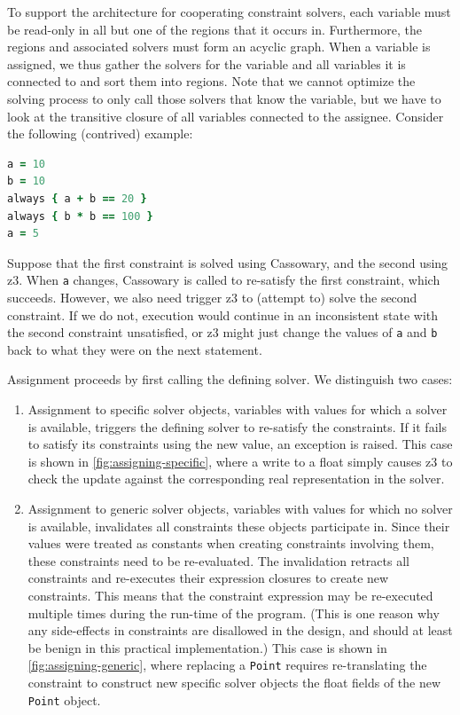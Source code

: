 To support the architecture for cooperating constraint solvers, each variable
must be read-only in all but one of the regions that it occurs in. Furthermore,
the regions and associated solvers must form an acyclic graph. When a variable
is assigned, we thus gather the solvers for the variable and all variables it is
connected to and sort them into regions. Note that we cannot optimize the
solving process to only call those solvers that know the variable, but we have
to look at the transitive closure of all variables connected to the assignee.
Consider the following (contrived) example:\\

\begin{lstlisting}[language=ruby]
a = 10
b = 10
always { a + b == 20 }
always { b * b == 100 }
a = 5
\end{lstlisting}
Suppose that the first constraint is solved using Cassowary, and the second
using \gls{z3}. When \lstinline{a} changes, Cassowary is called to re-satisfy
the first constraint, which succeeds. However, we also need trigger \gls{z3} to
(attempt to) solve the second constraint. If we do not, execution would continue
in an inconsistent state with the second constraint unsatisfied, or \gls{z3}
might just change the values of \lstinline{a} and \lstinline{b} back to what
they were on the next statement.

Assignment proceeds by first calling the defining solver. We distinguish two
cases:
\begin{enumerate}
\item[a)] Assignment to specific solver objects, \ie variables with values for
  which a solver is available, triggers the defining solver to re-satisfy the
  constraints. If it fails to satisfy its constraints using the new value, an
  exception is raised. This case is shown in \autoref{fig:assigning-specific},
  where a write to a float simply causes \gls{z3} to check the update against
  the corresponding real representation in the solver.
\item[b)] Assignment to generic solver objects, \ie variables with values for
  which no solver is available, invalidates all constraints these objects
  participate in. Since their values were treated as constants when creating
  constraints involving them, these constraints need to be re-evaluated. The
  invalidation retracts all constraints and re-executes their expression
  closures to create new constraints. This means that the constraint expression
  may be re-executed multiple times during the run-time of the program.  (This
  is one reason why any side-effects in constraints are disallowed in the
  design, and should at least be benign in this practical implementation.) This
  case is shown in \autoref{fig:assigning-generic}, where replacing a
  \lstinline{Point} requires re-translating the constraint to construct new
  specific solver objects the float fields of the new \lstinline{Point} object.
\end{enumerate}

